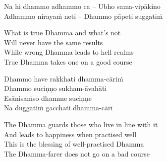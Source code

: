 \suttaRef{[SN 6.2]}

\begin{verses}
  Na hi dhammo adhammo ca – Ubho sama-vipākino\\
  Adhammo nirayaṁ neti – Dhammo pāpeti suggatiṁ
\end{verses}

\begin{english-verses}
  What is true Dhamma and what's\hyperlink{endnote29-appendix}{\hypertarget{endnote29-body}{}}
  not\\
  Will never have the same results\\
  While wrong\hyperlink{endnote30-appendix}{\hypertarget{endnote30-body}{}}
  Dhamma leads to hell realms\\
  True Dhamma takes one on a good course
\end{english-verses}

\begin{verses}
  Dhammo have rakkhati dhamma-cāriṁ\\
  Dhammo suciṇṇo sukham-āvahāti\\
  Esānisaṁso dhamme suciṇṇe\\
  Na duggatiṁ gacchati dhamma-cārī\hyperlink{endnote31-appendix}{\hypertarget{endnote31-body}{}}
\end{verses}

\begin{english-verses}
  The Dhamma guards those who live in line with it\\
  And leads to happiness when practised well\\
  This is the blessing of well-practised Dhamma\\
  The Dhamma-farer does not go on a bad course
\end{english-verses}

